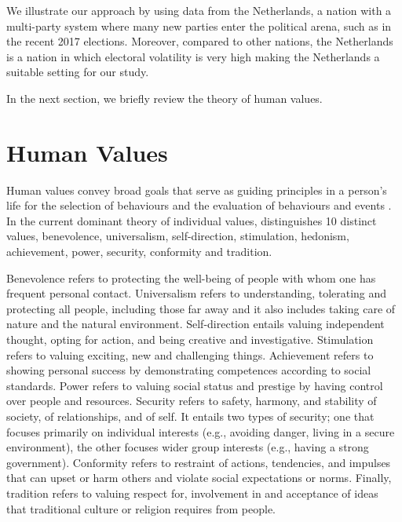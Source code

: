 \documentclass[12pt,letter]{article}\usepackage[]{graphicx}\usepackage[]{xcolor}
\begin{document}
We illustrate our approach by using data from the Netherlands, a nation with a multi-party system where many new parties enter the  political arena, such as in the recent 2017 elections. Moreover, compared to other nations, the Netherlands is a nation in which electoral volatility is very high \citep{dassonneville2013} making the Netherlands a suitable setting for our study.

In the next section, we briefly review the theory of human values.

\section*{Human Values}

Human values convey broad goals that serve as guiding principles in a person's life for the selection of behaviours and the evaluation of behaviours and events \citet{schwartz1992}. In the current dominant theory of individual values, \citet{schwartz1992}  distinguishes 10 distinct values, benevolence, universalism, self-direction, stimulation, hedonism, achievement, power, security, conformity and tradition. 

Benevolence refers to protecting the well-being of people with whom one has frequent personal contact. Universalism refers to understanding, tolerating and protecting all people, including those far away and it also includes taking care of nature and the natural environment. Self-direction entails valuing independent thought, opting for action, and being creative and investigative. Stimulation refers to valuing exciting, new and challenging things. Achievement refers to showing personal success by demonstrating competences according to social standards. Power refers to valuing social status and prestige by having control over people and resources. Security refers to safety, harmony, and stability of society, of relationships, and of self. It entails two types of security; one that focuses primarily on individual interests (e.g., avoiding danger, living in a secure environment), the other focuses wider group interests (e.g., having a strong government). Conformity refers to restraint of actions, tendencies, and impulses that can upset or harm others and violate social expectations or norms. Finally, tradition refers to valuing respect for, involvement in and acceptance of ideas that traditional culture or religion requires from people. 
\end{document}
